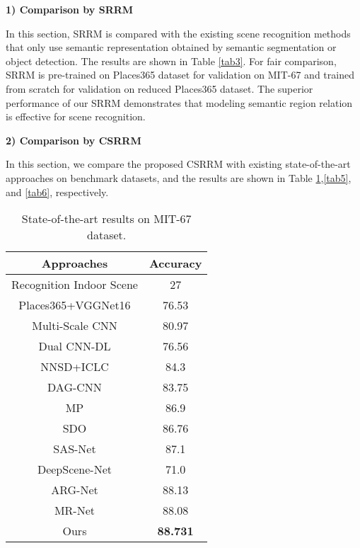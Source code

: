 \documentclass[conference]{IEEEtran}
\begin{document}
\textbf{1) Comparison by SRRM}

In this section, SRRM is compared with the existing scene recognition methods that only use semantic representation obtained by semantic segmentation or object detection. The results are shown in Table \ref{tab3}. For fair comparison, SRRM is pre-trained on Places365 dataset for validation on MIT-67 and trained from scratch for validation on reduced Places365 dataset. The superior performance of our SRRM demonstrates that modeling semantic region relation is effective for scene recognition. 

\textbf{2) Comparison by CSRRM}

In this section, we compare the proposed CSRRM with existing state-of-the-art approaches on benchmark datasets, and the results are shown in Table \ref{tab4},\ref{tab5}, and \ref{tab6}, respectively.

\begin{table}[htbp]
    \centering
    \caption{State-of-the-art results on MIT-67 dataset.}
    \begin{tabular}{cc}
    \hline
        \textbf{Approaches}  & \textbf{Accuracy}  \\ \hline
        Recognition Indoor Scene\cite{ref8}   & 27  \\ 
        Places365+VGGNet16\cite{ref14}   & 76.53  \\ 
        Multi-Scale CNN\cite{ref12}   & 80.97  \\ 
        Dual CNN-DL\cite{ref13}   & 76.56  \\ 
        NNSD+ICLC\cite{ref15}   & 84.3  \\ 
        DAG-CNN\cite{ref26}   & 83.75  \\ 
        MP\cite{ref27}   & 86.9  \\ 
        SDO\cite{ref7}   & 86.76  \\ 
        SAS-Net\cite{ref17}   & 87.1  \\ 
        DeepScene-Net\cite{ref28}   & 71.0  \\ 
        ARG-Net\cite{ref19}   & 88.13  \\ 
        MR-Net\cite{ref24}   & 88.08  \\ 
        Ours  & \textbf{88.731}  \\ \hline
    \end{tabular}
    \label{tab4}
\end{table}
\end{document}
